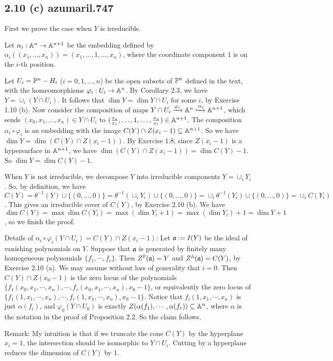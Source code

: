 \subsection*{2.10 (c) {azumaril.747}}

First we prove the case when $Y$ is irreducible. 

Let $\alpha_i:\A^n\to \A^{n+1}$ be the embedding defined by $\alpha_i((x_1,\ldots,x_n))=(x_1,\ldots,1,\ldots,x_n)$, where the coordinate component $1$ is on the $i$-th position. 

Let $U_i=\P^n-H_i$ ($i=0,1,\ldots,n$) be the open subsets of $\P^n$ defined in the text, with the homeomorphisms $\varphi_i:U_i\to\A^n$. By Corollary 2.3, we have $Y=\cup_i (Y\cap U_i)$. It follows that $\dim Y=\dim Y\cap U_i$ for some $i$, by Exercise 1.10 (b). Now consider the composition of maps $Y\cap U_i\xrightarrow{\varphi_i}\A^n \xhookrightarrow{\alpha_i}\A^{n+1}$, which sends $(x_0,x_1,\ldots,x_n)\in Y\cap U_i$ to $(\frac{x_o}{x_i},\ldots,1,\ldots,\frac{x_n}{x_i})\in \A^{n+1}$. The composition $\alpha_i\circ\varphi_i$ is an embedding with the image $C(Y)\cap Z(x_i-1)\subseteq \A^{n+1}$. So we have $\dim Y=\dim (C(Y)\cap Z(x_i-1))$. By Exercise 1.8, since $Z(x_i-1)$ is a hypersurface in $\A^{n+1}$, we have $\dim (C(Y)\cap Z(x_i-1))=\dim C(Y)-1$. So $\dim Y=\dim C(Y)-1$. 

When $Y$ is not irreducible, we decompose $Y$ into irreducible components $Y=\cup_i Y_i$. So, by definition, we have $C(Y)=\theta^{-1}(Y)\cup\{(0,\ldots,0)\}=\theta^{-1}(\cup_i Y_i)\cup\{(0,\ldots,0)\}=\cup_i \theta^{-1}(Y_i)\cup\{(0,\ldots,0)\}=\cup_i C(Y_i)$. This gives an irreducible cover of $C(Y)$, by Exercise 2.10 (b). We have $\dim C(Y)=\max \dim C(Y_i)=\max(\dim Y_i+1)=\max(\dim Y_i)+1=\dim Y +1$, so we finish the proof. 

Details of $\alpha_i\circ\varphi_i(Y\cap U_i)=C(Y)\cap Z(x_i-1)$: Let $\a:=I(Y)$ be the ideal of vanishing polynomials on $Y$. Suppose that $\a$ is generated by finitely many homogeneous polynomials $\{f_1,\cdots,f_r\}$. Then $Z^{\P}(\a)=Y$ and $Z^{\A}(\a)=C(Y)$, by Exercise 2.10 (a). We may assume without loss of generality that $i=0$. Then $C(Y)\cap Z(x_0-1)$ is the zero locus of the polynomials $\{f_1(x_0,x_1,\cdots,x_n),\cdots,f_r(x_0,x_1,\cdots,x_n), x_0-1\}$, or equivalently the zero locus of $\{f_1(1,x_1,\cdots,x_n),\cdots,f_r(1,x_1,\cdots,x_n), x_0-1\}$. Notice that $f_i(1,x_1,\cdots,x_n)$ is just $\alpha(f_i)$, and $\varphi_0(Y\cap U_0)$ is exactly $Z(\alpha(f_1),\cdots,\alpha(f_r))\subseteq \A^n$, where $\alpha$ is the notation in the proof of Proposition 2.2. So the claim follows. 

Remark: My intuition is that if we truncate the cone $C(Y)$ by the hyperplane $x_i=1$, the intersection should be isomorphic to $Y\cap U_i$. Cutting by a hyperplane reduces the dimension of $C(Y)$ by $1$.  